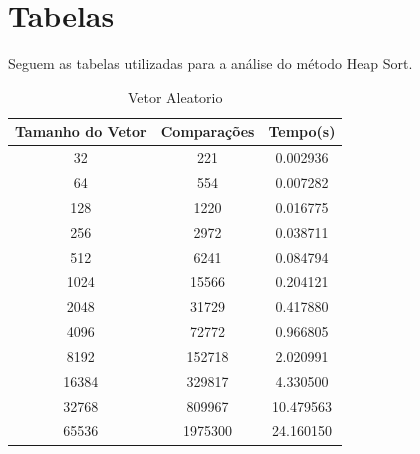 \documentclass[12pt,a4paper,twoside]{report}
\begin{document}
\chapter{Tabelas}

Seguem as tabelas utilizadas para a análise do método Heap Sort.

\begin{table}[h]
  \centering
  \caption{Vetor Aleatorio \label{tab:aleatorio}}
  \begin{tabular}{ccc} \\\hline
  \textbf{Tamanho do Vetor} & \textbf{Comparações} & \textbf{Tempo(s)} \\\hline
  32                        & 221                 & 0.002936          \\\hline
  64                        & 554                 & 0.007282          \\\hline
  128                       & 1220                & 0.016775         \\\hline
  256                       &  2972               & 0.038711          \\\hline
  512                       &  6241                & 0.084794         \\\hline
  1024                      & 15566               & 0.204121         \\\hline
  2048                      &  31729              & 0.417880          \\\hline
  4096                      & 72772              & 0.966805         \\\hline
  8192                      & 152718             & 2.020991         \\\hline
  16384                     & 329817            & 4.330500       \\\hline
  32768                     & 809967            & 10.479563        \\\hline
  65536                     & 1975300            & 24.160150       \\\hline
  \end{tabular}
\end{table}
\end{document}
